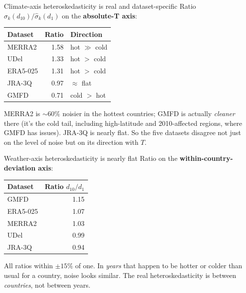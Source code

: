 \documentclass[10pt,aspectratio=169]{beamer}
\begin{document}
\begin{frame}{Climate-axis heteroskedasticity is real and dataset-specific}
  \centering
  \small
  Ratio $\hat\sigma_k(d_{10}) / \hat\sigma_k(d_1)$ on the \textbf{absolute-T axis}:

  \vspace{0.4em}
  \begin{tabular}{l r l}
    \toprule
    Dataset   & Ratio & Direction \\
    \midrule
    MERRA2    & 1.58 & hot $\gg$ cold \\
    UDel      & 1.33 & hot $>$ cold \\
    ERA5-025  & 1.31 & hot $>$ cold \\
    JRA-3Q    & 0.97 & $\approx$ flat \\
    GMFD      & 0.71 & cold $>$ hot \\
    \bottomrule
  \end{tabular}

  \vspace{0.6em}
  \footnotesize
  MERRA2 is $\sim\!60\%$ noisier in the hottest countries; GMFD is actually
  \emph{cleaner} there (it's the cold tail, including high-latitude and
  2010-affected regions, where GMFD has issues). JRA-3Q is nearly flat.
  So the five datasets disagree not just on the level of noise but on its
  direction with $T$.
\end{frame}

\begin{frame}{Weather-axis heteroskedasticity is nearly flat}
  \centering
  \small
  Ratio on the \textbf{within-country-deviation axis}:

  \vspace{0.4em}
  \begin{tabular}{l r}
    \toprule
    Dataset   & Ratio $d_{10}/d_1$ \\
    \midrule
    GMFD      & 1.15 \\
    ERA5-025  & 1.07 \\
    MERRA2    & 1.03 \\
    UDel      & 0.99 \\
    JRA-3Q    & 0.94 \\
    \bottomrule
  \end{tabular}

  \vspace{0.6em}
  \footnotesize
  All ratios within $\pm 15\%$ of one. In \emph{years} that happen to be
  hotter or colder than usual for a country, noise looks similar. The real
  heteroskedasticity is between \emph{countries}, not between years.
\end{frame}
\end{document}
